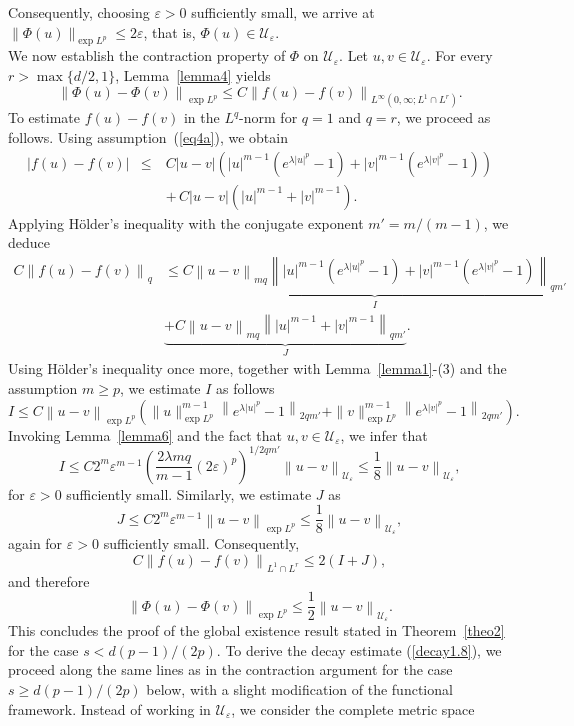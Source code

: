 \documentclass[a4paper,11pt]{amsart}
\renewcommand\eqref[1]{(\ref{#1})} %
\numberwithin{equation}{section}
\theoremstyle{plain}
\theoremstyle{definition}
\begin{document}
Consequently, choosing $\varepsilon > 0$ sufficiently small, we arrive at
$\|\Phi(u)\|_{\exp L^p}
\le 2\varepsilon$, that is, $\Phi(u) \in \mathcal{U}_\varepsilon$.\\
We now establish the contraction property of $\Phi$ on $\mathcal{U}_\varepsilon$. Let $u,v \in \mathcal{U}_\varepsilon$. For every  $r>\max\{d/2,1\}$, Lemma~\ref{lemma4} yields
$$
\left\|\Phi(u)-\Phi(v)\right\|_{\exp L^p}\leq
C\left\|f(u)-f(v)\right\|_{L^\infty(0,\infty;
L^1\cap L^r)}.
$$
To estimate $f(u)-f(v)$ in the $L^q$-norm for $q=1$ and $q=r$, we proceed as follows. Using assumption~(\ref{eq4a}), we obtain
\begin{eqnarray*}
|f(u)-f(v)|
&\leq&
C|u-v|
\left(|u|^{m-1}(e^{\lambda |u|^p}-1)
+|v|^{m-1}(e^{\lambda |v|^p}-1)\right) \\
&\quad&
+\,C|u-v|\left(|u|^{m-1}+|v|^{m-1}\right).
\end{eqnarray*}
Applying H\"older's inequality with the conjugate exponent  $m'=m/(m-1)$, we deduce
\begin{eqnarray*}
C\left\|f(u)-f(v)\right\|_{q}
&\le \underbrace{C \left\|u-v\right\|_{mq}
\left\|
|u|^{m-1}(e^{\lambda |u|^p}-1)
+|v|^{m-1}(e^{\lambda |v|^p}-1)
\right\|_{q m'}}_{I}\\
&\underbrace{+C\left\|u-v\right\|_{mq}
\left\||u|^{m-1}+|v|^{m-1}\right\|_{q m'}}_{J}.
\end{eqnarray*}
Using H\"older's inequality once more, together with 
Lemma~\ref{lemma1}-(3) and the assumption $m\ge p$, we estimate $I$ as follows
$$
I \le
C \left\|u-v\right\|_{\exp L^p} 
\left(
\|u\|^{m-1}_{\exp L^p}
\left\|e^{\lambda |u|^p}-1\right\|_{2 q m'}
+
\|v\|^{m-1}_{\exp L^p}
\left\|e^{\lambda |v|^p}-1\right\|_{2 q m'}
\right).
$$
Invoking Lemma~\ref{lemma6} and the fact that 
$u,v\in \mathcal{U}_\varepsilon$, we infer that
\[
I
\le
C2^m\varepsilon^{m-1}
\left(
\frac{2\lambda mq}{m-1}(2\varepsilon)^p
\right)^{1/2qm'}
\left\|u-v\right\|_{\mathcal{U}_\varepsilon}
\le
\frac18
\left\|u-v\right\|_{\mathcal{U}_\varepsilon},
\]
for $\varepsilon>0$ sufficiently small.
Similarly, we estimate $J$ as
$$
J
\le C2^m\varepsilon^{m-1}
\left\|u-v\right\|_{\exp L^p}
\le
\frac18
\left\|u-v\right\|_{\mathcal{U}_\varepsilon},
$$
again for $\varepsilon>0$ sufficiently small. Consequently,
\[
C\left\|f(u)-f(v)\right\|_{L^1 \cap L^r}
\le
2(I+J),
\]
and therefore
\[
\left\|\Phi(u)-\Phi(v)\right\|_{\exp L^p}
\le
\frac12
\left\|u-v\right\|_{\mathcal{U}_\varepsilon}.
\]
This concludes the proof of the global existence result stated in 
Theorem~\ref{theo2} for the case  $s<d(p-1)/(2p)$. To derive the decay estimate \eqref{decay1.8}, we proceed along the same lines as in the contraction argument for the case $s \ge d(p-1)/(2p)$ below, with a slight modification of the functional framework. Instead of working in $\mathcal{U}_\varepsilon$, we consider the complete metric space
\end{document}
